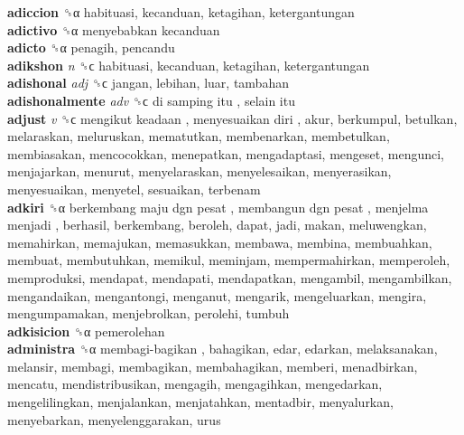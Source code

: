 \textbf{adiccion} ␝α  habituasi, kecanduan, ketagihan, ketergantungan  \\
\textbf{adictivo} ␝α   menyebabkan kecanduan   \\
\textbf{adicto} ␝α  penagih, pencandu  \\
\textbf{adikshon} \emph{n}  ␝ϲ  habituasi, kecanduan, ketagihan, ketergantungan  \\
\textbf{adishonal} \emph{adj}  ␝ϲ  jangan, lebihan, luar, tambahan  \\
\textbf{adishonalmente} \emph{adv}  ␝ϲ   di samping itu ,  selain itu   \\
\textbf{adjust} \emph{v}  ␝ϲ   mengikut keadaan ,  menyesuaikan diri , akur, berkumpul, betulkan, melaraskan, meluruskan, mematutkan, membenarkan, membetulkan, membiasakan, mencocokkan, menepatkan, mengadaptasi, mengeset, mengunci, menjajarkan, menurut, menyelaraskan, menyelesaikan, menyerasikan, menyesuaikan, menyetel, sesuaikan, terbenam  \\
\textbf{adkiri} ␝α   berkembang maju dgn pesat ,  membangun dgn pesat ,  menjelma menjadi , berhasil, berkembang, beroleh, dapat, jadi, makan, meluwengkan, memahirkan, memajukan, memasukkan, membawa, membina, membuahkan, membuat, membutuhkan, memikul, meminjam, mempermahirkan, memperoleh, memproduksi, mendapat, mendapati, mendapatkan, mengambil, mengambilkan, mengandaikan, mengantongi, menganut, mengarik, mengeluarkan, mengira, mengumpamakan, menjebrolkan, perolehi, tumbuh  \\
\textbf{adkisicion} ␝α  pemerolehan  \\
\textbf{administra} ␝α   membagi-bagikan , bahagikan, edar, edarkan, melaksanakan, melansir, membagi, membagikan, membahagikan, memberi, menadbirkan, mencatu, mendistribusikan, mengagih, mengagihkan, mengedarkan, mengelilingkan, menjalankan, menjatahkan, mentadbir, menyalurkan, menyebarkan, menyelenggarakan, urus  \\
